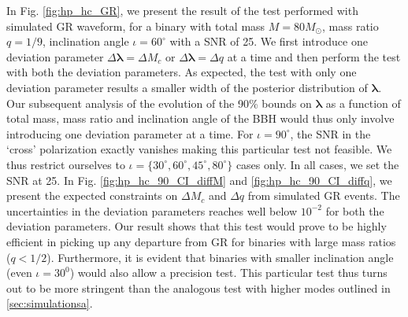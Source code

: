 \documentclass[prd,preprintnumbers,twocolumn,eqsecnum,floatfix,a4paper,nofootinbib,superscriptaddress]{revtex4}
\newcommand{\blambda}{\bm{\lambda}}
\begin{document}
In Fig. \ref{fig:hp_hc_GR}, we present the result of the test performed with simulated GR waveform, for a binary with total mass $M = 80M_{\odot}$, mass ratio $q=1/9$, inclination angle $ {\iota}=60^{\circ} $ with a SNR of 25. We first introduce one deviation parameter $\Delta\blambda = {\Delta M_c}$ or $\Delta\blambda = {\Delta q}$ at a time and then perform the test with both the deviation parameters. As expected, the test with only one deviation parameter results a smaller width of the posterior distribution of $\blambda$. Our subsequent analysis of the evolution of the 90\% bounds on $\blambda$ as a function of total mass, mass ratio and inclination angle of the BBH would thus only involve introducing one deviation parameter at a time. For $\iota=90^{\circ}$, the SNR in the `cross' polarization exactly vanishes making this particular test not feasible. We thus restrict ourselves to ${\iota}=\{30^{\circ},60^{\circ},45^{\circ},80^{\circ}\}$ cases only. In all cases, we set the SNR at 25. In Fig. \ref{fig:hp_hc_90_CI_diffM} and \ref{fig:hp_hc_90_CI_diffq}, we present the expected constraints on ${\Delta M_c}$ and ${\Delta q}$ from simulated GR events. The uncertainties in the deviation parameters reaches well below $10^{-2}$ for both the deviation parameters. Our result shows that this test would prove to be highly efficient in picking up any departure from GR for binaries with large mass ratios ($q < 1/ 2$). Furthermore, it is evident that binaries with smaller inclination angle (even $\iota=30^0$) would also allow a precision test. This particular test thus turns out to be more stringent than the analogous test with higher modes outlined in \ref{sec:simulationsa}.  
  
\end{document}
